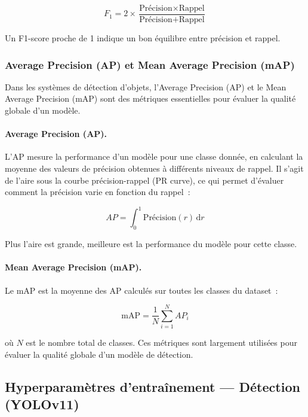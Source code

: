 \begin{equation}
F_1 = 2 \times \frac{\text{Précision} \times \text{Rappel}}{\text{Précision} + \text{Rappel}}
\label{eq:f1}
\end{equation}

Un F1-score proche de 1 indique un bon équilibre entre précision et rappel.

\subsubsection*{Average Precision (AP) et Mean Average Precision (mAP)}

Dans les systèmes de détection d'objets, l'Average Precision (AP) et le Mean Average
Precision (mAP) sont des métriques essentielles pour évaluer la qualité globale d'un modèle.

\paragraph{Average Precision (AP).}
L'AP mesure la performance d'un modèle pour une classe donnée, en calculant la
moyenne des valeurs de précision obtenues à différents niveaux de rappel.
Il s'agit de l'aire sous la courbe précision-rappel (PR curve), ce qui permet
d'évaluer comment la précision varie en fonction du rappel~:

\begin{equation}
AP = \int_0^1 \text{Précision}(r)\, \mathrm{d}r
\label{eq:ap}
\end{equation}

Plus l'aire est grande, meilleure est la performance du modèle pour cette classe.

\paragraph{Mean Average Precision (mAP).}
Le mAP est la moyenne des AP calculés sur toutes les classes du dataset~:

\begin{equation}
\text{mAP} = \frac{1}{N} \sum_{i=1}^{N} AP_i
\label{eq:map}
\end{equation}

où $N$ est le nombre total de classes. Ces métriques sont largement utilisées pour
évaluer la qualité globale d'un modèle de détection.

\subsection{Hyperparamètres d'entraînement --- Détection (YOLOv11)}

